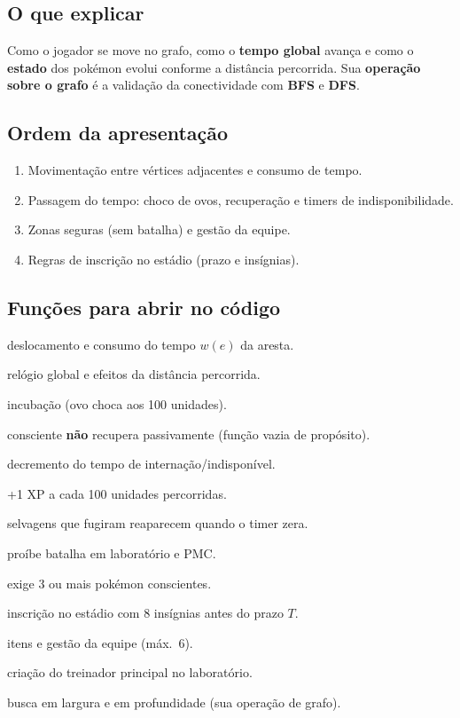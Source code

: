 \documentclass[11pt,a4paper]{article}
\begin{document}
\subsection{O que explicar}
Como o jogador se move no grafo, como o \textbf{tempo global} avança e como o
\textbf{estado} dos pokémon evolui conforme a distância percorrida. Sua
\textbf{operação sobre o grafo} é a validação da conectividade com \textbf{BFS} e \textbf{DFS}.

\subsection{Ordem da apresentação}
\begin{enumerate}[leftmargin=2em,itemsep=2pt]
  \item Movimentação entre vértices adjacentes e consumo de tempo.
  \item Passagem do tempo: choco de ovos, recuperação e timers de indisponibilidade.
  \item Zonas seguras (sem batalha) e gestão da equipe.
  \item Regras de inscrição no estádio (prazo e insígnias).
\end{enumerate}

\subsection{Funções para abrir no código}
\begin{description}[leftmargin=6em,style=nextline]
  \item[\texttt{moverTreinador}] deslocamento e consumo do tempo $w(e)$ da aresta.
  \item[\texttt{AvancarTempo}] relógio global e efeitos da distância percorrida.
  \item[\texttt{andandoChocarOvos}] incubação (ovo choca aos 100 unidades).
  \item[\texttt{andandoRecuperarHP}] consciente \textbf{não} recupera passivamente (função vazia de propósito).
  \item[\texttt{andandoIndisponivelReducao}] decremento do tempo de internação/indisponível.
  \item[\texttt{andandoGanharXP}] +1 XP a cada 100 unidades percorridas.
  \item[\texttt{andandoReporSelvagens}] selvagens que fugiram reaparecem quando o timer zera.
  \item[\texttt{verificar\_zonasegura}] proíbe batalha em laboratório e PMC.
  \item[\texttt{podeBatalhar}] exige 3 ou mais pokémon conscientes.
  \item[\texttt{podeInscrever} / \texttt{prazoExpirado}] inscrição no estádio com 8 insígnias antes do prazo $T$.
  \item[\texttt{podePegarOvo} / \texttt{usarErva} / \texttt{enviarParaCarvalho}] itens e gestão da equipe (máx.\ 6).
  \item[\texttt{criarJogador}] criação do treinador principal no laboratório.
  \item[\texttt{bfs} / \texttt{dfs}] busca em largura e em profundidade (sua operação de grafo).
\end{description}
\end{document}
